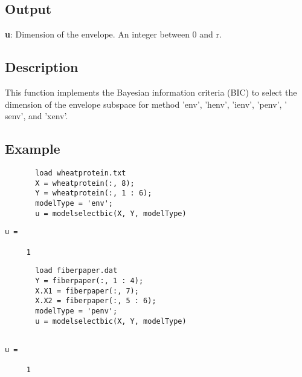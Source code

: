 \documentclass[a4paper,11pt,openany]{memoir}
\begin{document}
\subsection*{Output}

\begin{par}
\textbf{u}: Dimension of the envelope. An integer between 0 and r.
\end{par} \vspace{1em}


\subsection*{Description}

\begin{par}
This function implements the Bayesian information criteria (BIC) to select the dimension of the envelope subspace for method 'env', 'henv', 'ienv', 'penv', ' senv', and 'xenv'.
\end{par} \vspace{1em}


\subsection*{Example}


\begin{verbatim}       load wheatprotein.txt
       X = wheatprotein(:, 8);
       Y = wheatprotein(:, 1 : 6);
       modelType = 'env';
       u = modelselectbic(X, Y, modelType)\end{verbatim}
        \color{lightgray}\ttfamily \begin{verbatim}
u =

     1

\end{verbatim} \rmfamily
\color{black}    
\begin{verbatim}       load fiberpaper.dat
       Y = fiberpaper(:, 1 : 4);
       X.X1 = fiberpaper(:, 7);
       X.X2 = fiberpaper(:, 5 : 6);
       modelType = 'penv';
       u = modelselectbic(X, Y, modelType)\end{verbatim}
    

   \color{lightgray}\ttfamily \begin{verbatim}

u =

     1

\end{verbatim} \rmfamily
\color{black}
    

\newpage
\end{document}
